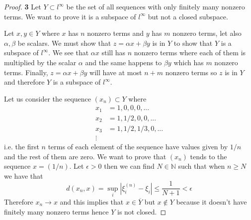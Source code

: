 \documentclass[11pt]{article}
\newcommand{\N}{\mathbb{N}}
\theoremstyle{definition}
\begin{document}
\begin{proof}{\textbf{3}}
    Let $Y \subset l^\infty$ be the set of all sequences with only finitely
    many nonzero terms. We want to prove it is a subspace of $l^\infty$ but
    not a closed subspace.

    Let $x,y \in Y$ where $x$ has $n$ nonzero terms and $y$ has $m$ nonzero
    terms, let also $\alpha, \beta$ be scalars. We must show that
    $z = \alpha x + \beta y$ is in $Y$ to show that $Y$ is a subspace of
    $l^\infty$. We see that $\alpha x$ still has $n$ nonzero terms where each
    of them is multiplied by the scalar $\alpha$ and the same happens to
    $\beta y$ which has $m$ nonzero terms. Finally, $z = \alpha x + \beta y$
    will have at most $n + m$ nonzero terms so $z$ is in $Y$ and therefore 
    $Y$ is a subspace of $l^\infty$.
    
    Let us consider the sequence $(x_n) \subset Y$ where 
    \begin{align*}
        x_1 &= 1, 0, 0, 0, ...\\
        x_2 &= 1, 1/2, 0, 0, ...\\
        x_3 &= 1, 1/2, 1/3, 0, ...\\
        \vdots
    \end{align*}
    i.e. the first $n$ terms of each element of the sequence have values given
    by $1/n$ and the rest of them are zero.
    We want to prove that $(x_n)$ tends to the sequence $x = (1/n)$.
    Let $\epsilon > 0$ then we can find $N \in \N$ such that when $n \geq N$
    we have that
    $$d(x_n, x) = \sup_i |\xi_i^{(n)} - \xi_i| \leq \frac{1}{N + 1} < \epsilon$$
    Therefore $x_n \to x$ and this implies that $x \in \overline{Y}$ but
    $x \not\in Y$ because it doesn't have finitely many nonzero terms
    hence $Y$ is not closed.
\end{proof}
\cleardoublepage
\end{document}
